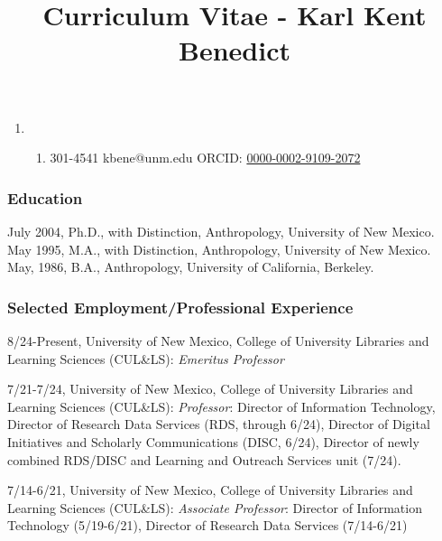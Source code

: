 \documentclass[]{article}
\title{Curriculum Vitae - Karl Kent Benedict}
\providecommand{\tightlist}{%
  \setlength{\itemsep}{0pt}\setlength{\parskip}{0pt}}
\begin{document}
\thetitle %

\begin{enumerate}
\def\labelenumi{(\alph{enumi})}
\setcounter{enumi}{12}
\tightlist
\item
  \begin{enumerate}
  \def\labelenumii{(\arabic{enumii})}
  \setcounter{enumii}{504}
  \tightlist
  \item
    301-4541 \textbar{} kbene@unm.edu \textbar{} ORCID:
    \href{https://orcid.org/0000-0002-9109-2072}{0000-0002-9109-2072}
  \end{enumerate}
\end{enumerate}

\subsubsection{Education}\label{education}

July 2004, Ph.D., with Distinction, Anthropology, University of New
Mexico.\\
May 1995, M.A., with Distinction, Anthropology, University of New
Mexico.\\
May, 1986, B.A., Anthropology, University of California, Berkeley.

\subsubsection{Selected Employment/Professional
Experience}\label{selected-employmentprofessional-experience}

8/24-Present, University of New Mexico, College of University Libraries
and Learning Sciences (CUL\&LS): \emph{Emeritus Professor}

7/21-7/24, University of New Mexico, College of University Libraries and
Learning Sciences (CUL\&LS): \emph{Professor}: Director of Information
Technology, Director of Research Data Services (RDS, through 6/24),
Director of Digital Initiatives and Scholarly Communications (DISC,
6/24), Director of newly combined RDS/DISC and Learning and Outreach
Services unit (7/24).

7/14-6/21, University of New Mexico, College of University Libraries and
Learning Sciences (CUL\&LS): \emph{Associate Professor}: Director of
Information Technology (5/19-6/21), Director of Research Data Services
(7/14-6/21)
\end{document}
